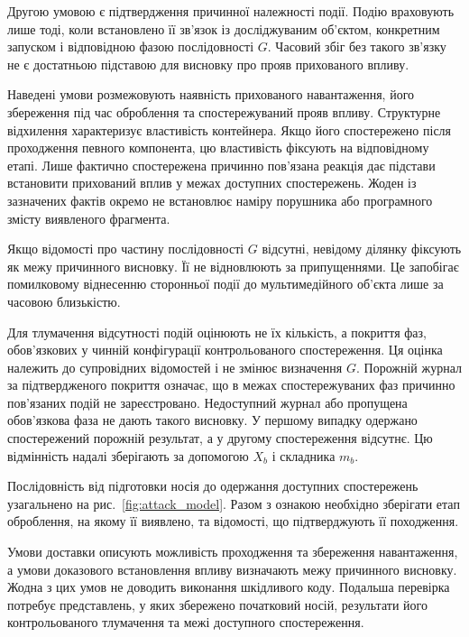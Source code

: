 Другою умовою є підтвердження причинної належності події. Подію враховують лише тоді, коли встановлено її зв’язок із досліджуваним об’єктом, конкретним запуском і відповідною фазою послідовності $G$. Часовий збіг без такого зв’язку не є достатньою підставою для висновку про прояв прихованого впливу.

Наведені умови розмежовують наявність прихованого навантаження, його збереження під час оброблення та спостережуваний прояв впливу. Структурне відхилення характеризує властивість контейнера. Якщо його спостережено після проходження певного компонента, цю властивість фіксують на відповідному етапі. Лише фактично спостережена причинно пов’язана реакція дає підстави встановити прихований вплив у межах доступних спостережень. Жоден із зазначених фактів окремо не встановлює наміру порушника або програмного змісту виявленого фрагмента.

Якщо відомості про частину послідовності $G$ відсутні, невідому ділянку фіксують як межу причинного висновку. Її не відновлюють за припущеннями. Це запобігає помилковому віднесенню сторонньої події до мультимедійного об’єкта лише за часовою близькістю.

Для тлумачення відсутності подій оцінюють не їх кількість, а покриття фаз, обов’язкових у чинній конфігурації контрольованого спостереження. Ця оцінка належить до супровідних відомостей і не змінює визначення $G$. Порожній журнал за підтвердженого покриття означає, що в межах спостережуваних фаз причинно пов’язаних подій не зареєстровано. Недоступний журнал або пропущена обов’язкова фаза не дають такого висновку. У першому випадку одержано спостережений порожній результат, а у другому спостереження відсутнє. Цю відмінність надалі зберігають за допомогою $X_b$ і складника $m_b$.

Послідовність від підготовки носія до одержання доступних спостережень узагальнено на рис.~\ref{fig:attack_model}. Разом з ознакою необхідно зберігати етап оброблення, на якому її виявлено, та відомості, що підтверджують її походження.



Умови доставки описують можливість проходження та збереження навантаження, а умови доказового встановлення впливу визначають межу причинного висновку. Жодна з цих умов не доводить виконання шкідливого коду. Подальша перевірка потребує представлень, у яких збережено початковий носій, результати його контрольованого тлумачення та межі доступного спостереження.

